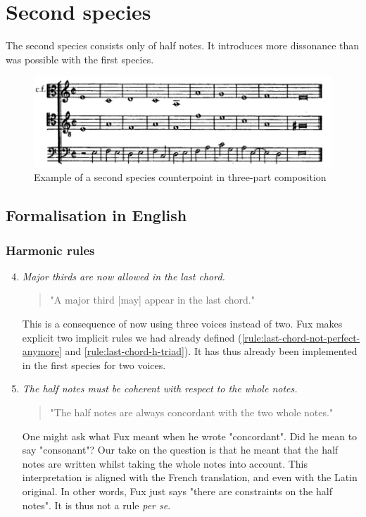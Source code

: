 \section{Second species}
The second species consists only of half notes. It introduces more dissonance than was possible with the first species. 

\begin{figure}[h]
    \centering
    \includegraphics[width=1\textwidth]{Images/Species_examples/2sp-example.png}
    \caption{Example of a second species counterpoint in three-part composition}
    \label{fig:example-2sp}
\end{figure}
\subsection{Formalisation in English}\label{formalisation-en-2nd}
\subsubsection{Harmonic rules}
\begin{enumerate}[wide, label=\bfseries 2.H\arabic*]
\setcounter{enumi}{3} %
    \item \textit{Major thirds are now allowed in the last chord.} \label{rule:major-third-last-chord}    
    \begin{quotation}
        "A major third [may] appear in the last chord."
        \textcite[p.87]{GaPEng}
    \end{quotation}
    This is a consequence of now using three voices instead of two. Fux makes explicit two implicit rules we had already defined (\ref{rule:last-chord-not-perfect-anymore} and \ref{rule:last-chord-h-triad}). It has thus already been implemented in the first species for two voices.

    \item \textit{The half notes must be coherent with respect to the whole notes.} \label{rule:concur-2nd}    
    \begin{quotation}
        "The half notes are always concordant with the two whole notes."
        \textcite[p.88]{GaPEng}
    \end{quotation}
    One might ask what Fux meant when he wrote "concordant". Did he mean to say "consonant"? Our take on the question is that he meant that the half notes are written whilst taking the whole notes into account. This interpretation is aligned with the French translation, and even with the Latin original. In other words, Fux just says "there are constraints on the half notes". It is thus not a rule \textit{per se}.
\end{enumerate}

